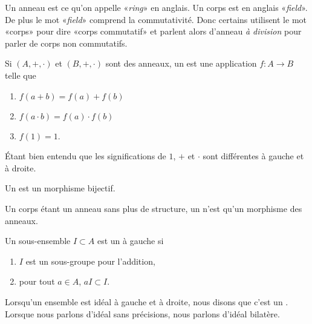 \begin{remark}      \label{REMooYRNUooYgBBKF}
    Un anneau est ce qu'on appelle «\emph{ring}» en anglais. Un corps est en anglais «\emph{field}». De plus le mot «\emph{field}» comprend la commutativité. Donc certains utilisent le mot «corps» pour dire «corps commutatif» et parlent alors d'anneau \emph{à division} pour parler de corps non commutatifs.
\end{remark}

\begin{definition}      \label{DEFooQBGJooKJqHXr}
    Si \( (A,+,\cdot)\) et \( (B,+,\cdot)\) sont des anneaux, un  est une application \( f\colon A\to B\) telle que
    \begin{enumerate}
        \item \( f(a+b)=f(a)+f(b)\)
        \item
            \( f(a\cdot b)=f(a)\cdot f(b)\)
        \item
            \( f(1)=1\).
    \end{enumerate}
    Étant bien entendu que les significations de \( 1\), $+$ et \( \cdot\) sont différentes à gauche et à droite. 

    Un  est un morphisme bijectif.

    Un corps étant un anneau sans plus de structure, un  n'est qu'un morphisme des anneaux.
\end{definition}


\begin{definition}  \label{DefooQULAooREUIU}
    Un sous-ensemble \( I\subset A\) est un  à gauche si
    \begin{enumerate}
        \item
            \( I\) est un sous-groupe pour l'addition,
        \item
            pour tout \( a\in A\), \( aI\subset I\).
    \end{enumerate}

    Lorsqu'un ensemble est idéal à gauche et à droite, nous disons que c'est un . Lorsque nous parlons d'idéal sans précisions, nous parlons d'idéal bilatère.
\end{definition}


